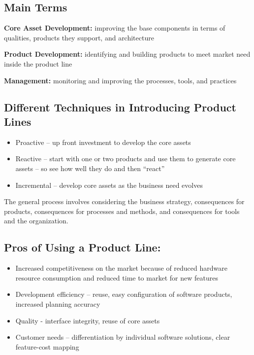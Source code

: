 \documentclass[a4paper]{article}
\begin{document}
\subsection{Main Terms}
\textbf{Core Asset Development:} improving the base components in terms of qualities, products they support, and architecture

\textbf{Product Development:} identifying and building products to meet market need inside the product line

\textbf{Management:} monitoring and improving the processes, tools, and practices

\subsection{Different Techniques in Introducing Product Lines}
\begin{itemize}
\item Proactive – up front investment to develop the core assets
\item Reactive – start with one or two products and use them to generate core assets – so see how well they do and then “react”
\item Incremental – develop core assets as the business need evolves
\end{itemize}
The general process involves considering the business strategy, consequences for products, consequences for processes and methods, and consequences for tools and the organization.

\subsection{Pros of Using a Product Line:}
\begin{itemize}
\item Increased competitiveness on the market because of reduced hardware resource consumption and reduced time to market for new features
\item Development efficiency – reuse, easy configuration of software products, increased planning accuracy
\item Quality  - interface integrity, reuse of core assets
\item Customer needs – differentiation by individual software solutions, clear feature-cost mapping
\end{itemize}
\end{document}
